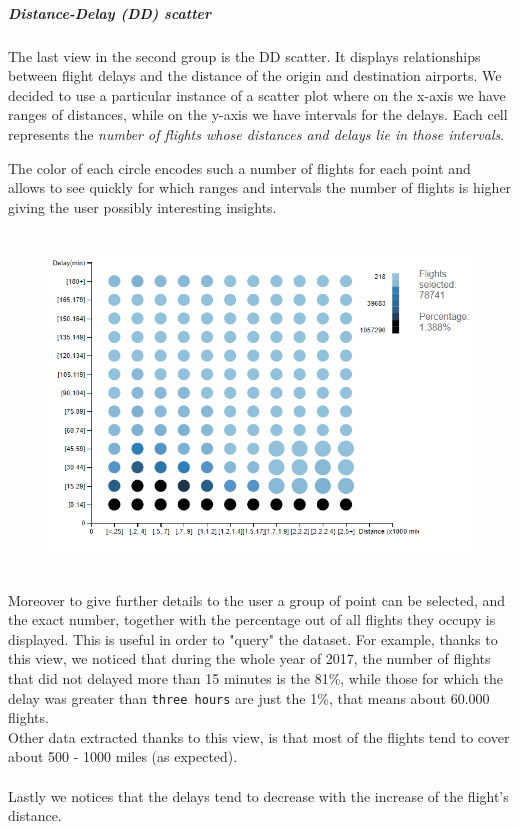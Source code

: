 \documentclass[a4paper, 12pt]{article}
\begin{document}
\subparagraph{Distance-Delay (DD) scatter} 
The last view in the second group is the DD scatter. It displays relationships between flight delays and
the distance of the origin and destination airports.
We decided to use a particular instance of a scatter plot where on the x-axis we have ranges of 
distances, while on the y-axis we have intervals for the delays. Each cell represents the 
\textit{number of flights whose distances and delays lie in those intervals}.


The color of each circle encodes such a number of flights for each point and allows to see quickly
for which ranges and intervals the number of flights is higher giving the user possibly interesting
insights.
\\ 
\\
\begin{figure}[h]	
\centering
\includegraphics[scale=0.7]{ddscat.PNG}
\end{figure}
\\
Moreover to give further details to the user a group of point can be selected, and the exact number,
together with the percentage out of all flights they occupy is displayed. This is useful in order to
"query" the dataset. For example, thanks to this view, we noticed that during the whole year of 2017,
the number of flights that did not delayed more than 15 minutes is the 81\%, while those for which the
delay was greater than \texttt{three hours} are just the 1\%, that means about 60.000 flights.
\\
Other data extracted thanks to this view, is that most of the flights tend to cover about 500 - 1000
miles (as expected).
\\
\\
Lastly we notices that the delays tend to decrease with the increase of the flight's distance. 
\end{document}
